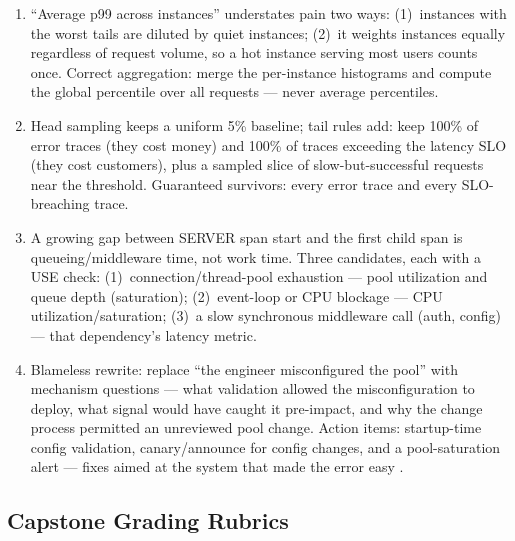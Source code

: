 \begin{enumerate}[leftmargin=2.2em]
    the other 49 \cite{opentelemetrydocs}.
  \item ``Average p99 across instances'' understates pain two ways:
    (1)~instances with the worst tails are diluted by quiet instances;
    (2)~it weights instances equally regardless of request volume, so a hot
    instance serving most users counts once. Correct aggregation: merge the
    per-instance histograms and compute the global percentile over all
    requests --- never average percentiles.
  \item Head sampling keeps a uniform 5\% baseline; tail rules add: keep
    100\% of error traces (they cost money) and 100\% of traces exceeding
    the latency SLO (they cost customers), plus a sampled slice of
    slow-but-successful requests near the threshold. Guaranteed survivors:
    every error trace and every SLO-breaching trace.
  \item A growing gap between SERVER span start and the first child span is
    queueing/middleware time, not work time. Three candidates, each with a
    USE check: (1)~connection/thread-pool exhaustion --- pool utilization
    and queue depth (saturation); (2)~event-loop or CPU blockage --- CPU
    utilization/saturation; (3)~a slow synchronous middleware call (auth,
    config) --- that dependency's latency metric.
  \item Blameless rewrite: replace ``the engineer misconfigured the pool''
    with mechanism questions --- what validation allowed the
    misconfiguration to deploy, what signal would have caught it pre-impact,
    and why the change process permitted an unreviewed pool change. Action
    items: startup-time config validation, canary/announce for config
    changes, and a pool-saturation alert --- fixes aimed at the system that
    made the error easy \cite{beyer2016sre}.
\end{enumerate}

\subsection{Capstone Grading Rubrics}

